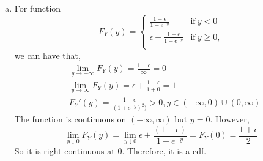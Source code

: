\documentclass[letter]{article}
\begin{document}
\begin{enumerate}[(a)]
        \item
        For function
        \[
        F_Y(y) = \begin{cases}
        \frac{1-\epsilon}{1+e^{-y}} & \text{if}~y < 0 \\
        \epsilon + \frac{1-\epsilon}{1+e^{-y}} & \text{if}~y \geq 0, \\
        \end{cases}
        \]
        we can have that,
        \begin{align*}
        & \lim_{y \to -\infty} F_Y(y) = \frac{1-\epsilon}{\infty} = 0 \\
        & \lim_{y \to \infty} F_Y(y) = \epsilon + \frac{1-\epsilon}{1+0} = 1 \\
        & F_Y'(y) = \frac{1-\epsilon}{(1+e^{-y})^2)} >0,  y \in (-\infty, 0) \cup (0, \infty) 
        \end{align*}
        The function is continuous on $(-\infty, \infty)$ but $y=0$. However,
        \[
        \lim_{y \downarrow 0} F_Y(y) = \lim_{y \downarrow 0} \epsilon + \frac{(1-\epsilon)}{1+e^{-y}} = F_Y(0) = \frac{1+\epsilon}{2} 
        \]
        So it is right continuous at $0$. Therefore, it is a cdf.

    \end{enumerate}
\end{document}

